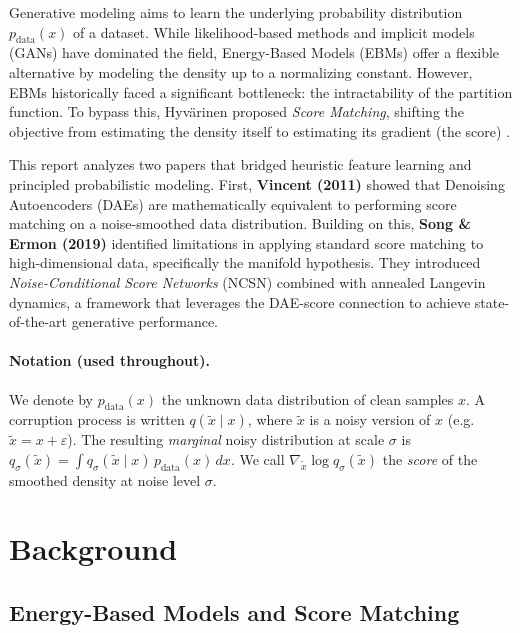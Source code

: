 \documentclass[11pt,a4paper]{article}
\begin{document}
Generative modeling aims to learn the underlying probability distribution $p_{\text{data}}(x)$ of a dataset. While likelihood-based methods and implicit models (GANs) have dominated the field, Energy-Based Models (EBMs) offer a flexible alternative by modeling the density up to a normalizing constant. However, EBMs historically faced a significant bottleneck: the intractability of the partition function. To bypass this, Hyvärinen proposed \textit{Score Matching}, shifting the objective from estimating the density itself to estimating its gradient (the score) \cite{hyvarinen2005}.

This report analyzes two papers that bridged heuristic feature learning and principled probabilistic modeling. First, \textbf{Vincent (2011)} \cite{vincent2011} showed that Denoising Autoencoders (DAEs) are mathematically equivalent to performing score matching on a noise-smoothed data distribution. Building on this, \textbf{Song \& Ermon (2019)} \cite{song2019} identified limitations in applying standard score matching to high-dimensional data, specifically the manifold hypothesis. They introduced \textit{Noise-Conditional Score Networks} (NCSN) combined with annealed Langevin dynamics, a framework that leverages the DAE-score connection to achieve state-of-the-art generative performance.

\paragraph{Notation (used throughout).}
We denote by $p_{\text{data}}(x)$ the unknown data distribution of clean samples $x$.
A corruption process is written $q(\tilde{x}\mid x)$, where $\tilde{x}$ is a noisy version of $x$ (e.g. $\tilde{x}=x+\varepsilon$).
The resulting \emph{marginal} noisy distribution at scale $\sigma$ is
$q_\sigma(\tilde{x})=\int q_\sigma(\tilde{x}\mid x)\,p_{\text{data}}(x)\,dx$.
We call $\nabla_{\tilde{x}}\log q_\sigma(\tilde{x})$ the \emph{score} of the smoothed density at noise level $\sigma$.



\section{Background}

\subsection{Energy-Based Models and Score Matching}
\end{document}
